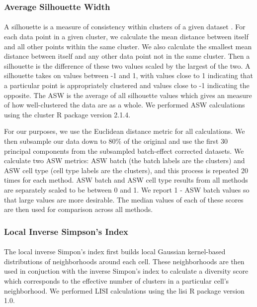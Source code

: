\documentclass[
12pt, %
letterpaper, %
oneside, %
headinclude,footinclude, %
BCOR5mm, %
]{scrartcl}
\begin{document}
\subsubsection*{Average Silhouette Width}

\paragraph*{}
A silhouette is a measure of consistency within clusters of a given dataset \citep{rousseeuw1987silhouettes}. For each data point in a given cluster, we calculate the mean distance between itself and all other points within the same cluster. We also calculate the smallest mean distance between itself and any other data point not in the same cluster. Then a silhouette is the difference of these two values scaled by the largest of the two. A silhouette takes on values between -1 and 1, with values close to 1 indicating that a particular point is appropriately clustered and values close to -1 indicating the opposite. The ASW is the average of all silhouette values which gives an measure of how well-clustered the data are as a whole. We performed ASW calculations using the cluster R package \citep{maechler2022cluster} version 2.1.4.

For our purposes, we use the Euclidean distance metric for all calculations. We then subsample our data down to 80\% of the original and use the first 30 principal components from the subsampled batch-effect corrected datasets. We calculate two ASW metrics: ASW batch (the batch labels are the clusters) and ASW cell type (cell type labels are the clusters), and this process is repeated 20 times for each method. ASW batch and ASW cell type results from all methods are separately scaled to be between 0 and 1. We report 1 - ASW batch values so that large values are more desirable. The median values of each of these scores are then used for comparison across all methods.

\subsubsection*{Local Inverse Simpson's Index}

\paragraph*{}
The local inverse Simpon's index \citep{korsunsky2019fast} first builds local Gaussian kernel-based distributions of neighborhoods around each cell. These neighborhoods are then used in conjuction with the inverse Simpon's index to calculate a diversity score which corresponds to the effective number of clusters in a particular cell's neighborhood. We performed LISI calculations using the lisi R package \citep{korsunky2019lisi} version 1.0.
\end{document}
